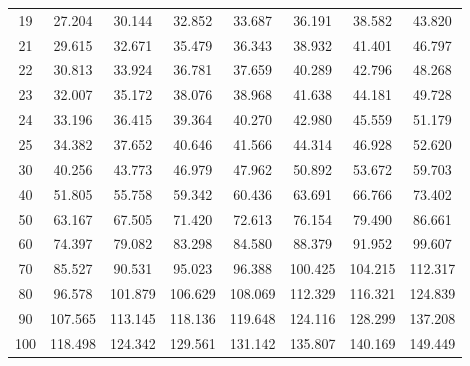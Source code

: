 \documentclass[12pt]{article}
\begin{document}
\begin{table}
\begin{center}
{\begin{tabular}{|c|c|c|c|c|c|c|c|}
19 & 27.204 & 30.144 & 32.852 & 33.687 & 36.191 &38.582 & 43.820\\
21 & 29.615  &32.671 & 35.479 & 36.343 & 38.932 & 41.401 & 46.797\\
22 & 30.813&  33.924 & 36.781 & 37.659 & 40.289 & 42.796 & 48.268\\
23 & 32.007 & 35.172 & 38.076 & 38.968 & 41.638 & 44.181 & 49.728\\
24 & 33.196 & 36.415 & 39.364 & 40.270 & 42.980 & 45.559 & 51.179\\
25 & 34.382 & 37.652 & 40.646 & 41.566 & 44.314 & 46.928 & 52.620\\
30 & 40.256 & 43.773 & 46.979 & 47.962 & 50.892 & 53.672 & 59.703\\
40 & 51.805 & 55.758 & 59.342 & 60.436 & 63.691 &66.766 & 73.402\\
50 & 63.167 & 67.505 & 71.420 & 72.613 & 76.154 & 79.490 & 86.661\\
60 & 74.397 & 79.082 & 83.298 & 84.580 & 88.379 & 91.952 & 99.607\\
70 & 85.527 & 90.531 & 95.023 & 96.388 & 100.425& 104.215 &112.317\\
80 & 96.578 & 101.879 & 106.629 &108.069 &112.329 &116.321 &124.839\\
90 & 107.565 &113.145 &118.136& 119.648& 124.116& 128.299& 137.208\\
100 & 118.498 &124.342 &129.561 &131.142 &135.807 &140.169
&149.449\\
  \hline
\end{tabular}
}
\end{center}
\end{table}

\end{document}
